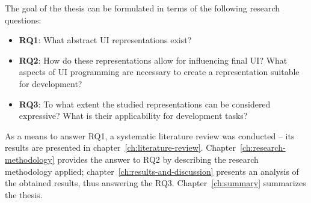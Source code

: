 
The goal of the thesis can be formulated in terms of the following research questions:
\begin{itemize}
    \item \textbf{RQ1}: What abstract UI representations exist?
    \item \textbf{RQ2}: How do these representations allow for influencing final UI? What aspects of UI programming are necessary to create a representation suitable for development?
    \item \textbf{RQ3}: To what extent the studied representations can be considered expressive? What is their applicability for development tasks?
\end{itemize}

As a means to answer RQ1, a systematic literature review was conducted -- its results are presented in chapter~\ref{ch:literature-review}.
Chapter~\ref{ch:research-methodology} provides the answer to RQ2 by describing the research methodology applied;
chapter~\ref{ch:results-and-discussion} presents an analysis of the obtained results, thus answering the RQ3.
Chapter~\ref{ch:summary} summarizes the thesis.
